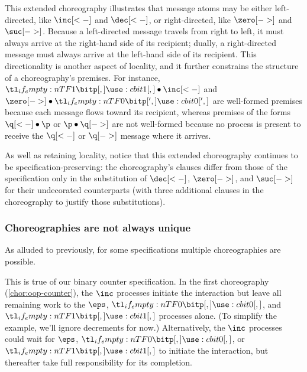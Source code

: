 \documentclass[
  class=../hdeyoung-proposal,
  crop=false
]{standalone}
\begin{document}
This extended choreography illustrates that message atoms may be either left-directed, like $\inc[<-]$ and $\dec[<-]$, or right-directed, like $\zero[->]$ and $\suc[->]$.
% 
Because a left-directed message travels from right to left, it must always arrive at the right-hand side of its recipient; dually, a right-directed message must always arrive at the left-hand side of its recipient.
This directionality is another aspect of locality, and it further constrains the structure of a choreography's premises.  For instance, $\bit{1} \fuse \inc[<-]$ and $\zero[->] \fuse \bit[']{0}$ are well-formed premises because each message flows toward its recipient, whereas premises of the forms $\q[<-] \fuse \p$ or $\p \fuse \q[->]$ are not well-formed because no process is present to receive the $\q[<-]$ or $\q[->]$ message where it arrives.

As well as retaining locality, notice that this extended choreography continues to be specification-preserving:
the choreography's clauses differ from those of the specification only in the substitution of $\dec[<-]$, $\zero[->]$, and $\suc[->]$ for their undecorated counterparts (with three additional clauses in the choreography to justify those substitutions).


\subsubsection{Choreographies are not always unique}\label{sec:mult-chor-are}

As alluded to previously, for some specifications multiple choreographies are possible.

This is true of our binary counter specification.
%
In the first choreography (\cref{chor:oop-counter}),
the $\inc$ processes initiate the interaction but leave all remaining work to the $\eps$, $\bit{0}$, and $\bit{1}$ processes alone.
(To simplify the example, we'll ignore decrements for now.)
Alternatively, the $\inc$ processes could wait for $\eps$, $\bit{0}$, or $\bit{1}$ to initiate the interaction, but thereafter take full responsibility for its completion.
\end{document}
